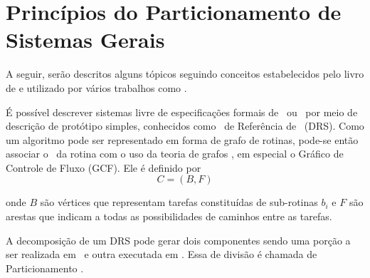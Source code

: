 \chapter{Princípios do Particionamento  de Sistemas Gerais} \label{chap:design}
    
    A seguir, serão descritos alguns tópicos seguindo conceitos estabelecidos pelo livro de \citet{Sass2010} e utilizado por vários trabalhos como \citet{Arato2003, Arato2005, Mann2007, BenHajHassine2017}.
    
    É possível descrever sistemas livre de especificações formais de \software\ ou \hardware\ por meio de descrição de protótipo simples, conhecidos como \Design\ de Referência de \Software\ (DRS).
    Como um algoritmo pode ser representado em forma de grafo de rotinas, pode-se então associar o \design\ da rotina com o uso da teoria de grafos \citep{Mann2007}, em especial o Gráfico de Controle de Fluxo (GCF).
    Ele é definido por
    \begin{equation}
        C = (B, F) \label{eq:subrotina}
    \end{equation}
    
    onde $B$ são vértices que representam tarefas constituídas de sub-rotinas $ b_i $
    e $ F $ são arestas que indicam a todas as possibilidades de caminhos entre as tarefas.
    
    
    A decomposição de um DRS pode gerar dois componentes sendo uma porção a ser realizada em \hardware\ e outra executada em \software.
    Essa de divisão é chamada de Particionamento \HS.
    
